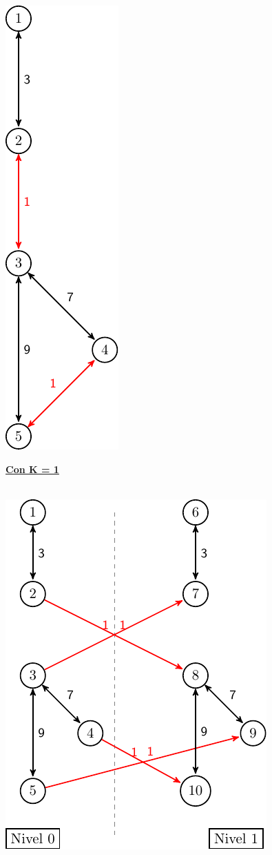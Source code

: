 \begin{center}
\includegraphics[scale=0.75]{imagenes/ej1_ex.pdf}
\\
\end{center}
\underline{\textbf{Con K = 1}}
\\
\\
\begin{center}
\includegraphics[scale=0.75]{imagenes/ej1_ex_k1.pdf}
\\
\end{center}

